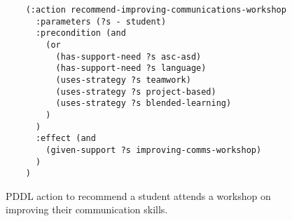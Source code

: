 \begin{figure}[t]
    \begin{lstlisting}
    (:action recommend-improving-communications-workshop
      :parameters (?s - student)
      :precondition (and
        (or
          (has-support-need ?s asc-asd)
          (has-support-need ?s language)
          (uses-strategy ?s teamwork)
          (uses-strategy ?s project-based)
          (uses-strategy ?s blended-learning)
        )
      )
      :effect (and 
        (given-support ?s improving-comms-workshop)
      )
    )
    \end{lstlisting}
    \caption{PDDL action to recommend a student attends a workshop on improving their communication skills.}\label{fig:pddl-action}
\end{figure}